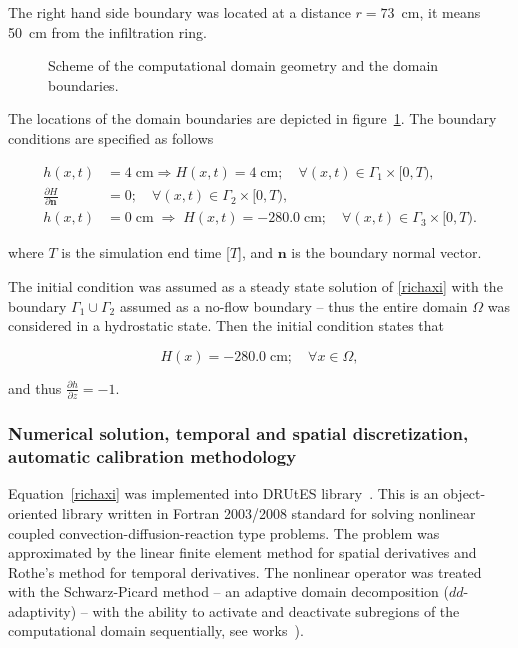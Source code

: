 \documentclass[review]{elsarticle}
\newenvironment{lineq}
    {\begin{linenomath*}
    \begin{equation}
    }
    { 
    \end{equation} 
    \end{linenomath*}
    }
\renewcommand{\vec}{\mathbf}
\begin{document}
The right hand side boundary was located at a distance $r=73$~cm, it means 50~cm from the infiltration ring. 

 \begin{figure}
\centering
{}
 \caption{Scheme of the computational domain geometry and the domain boundaries.}
 \label{valecbc}
\end{figure}


The locations of the domain boundaries are depicted in figure~\ref{valecbc}. The boundary conditions are specified as follows
\begin{lineq} 
\begin{split}
h(x,t) &= 4 \; \mbox{cm} \Rightarrow H(x,t) = 4 \; \mbox{cm}; \quad \forall (x,t) \in \Gamma_1 \times [0,T), \\
\frac{\partial H}{\partial \vec{n}} &= 0; \quad \forall (x,t) \in \Gamma_2 \times [0,T), \\
h(x,t) &= 0  \; \mbox{cm}  \; \Rightarrow \; H(x,t) = -280.0  \; \mbox{cm}; \quad \forall (x,t) \in \Gamma_3 \times [0,T).
\end{split}
\end{lineq}
where $T$ is the simulation end time [$T$], and $\vec{n}$ is the boundary normal vector.

The initial condition was assumed as a steady state  solution  of \eqref{richaxi} with the boundary $\Gamma_1 \cup \Gamma_2$ assumed as a no-flow boundary -- thus the entire domain $\Omega$ was considered in a hydrostatic state.  Then the initial condition states that 
\begin{lineq}
H(x) = -280.0 \; \mbox{cm}; \quad \forall x \in \Omega,
\end{lineq}
and thus $\frac{\partial h}{\partial z} = -1$.


\subsubsection{Numerical solution, temporal and spatial discretization, automatic calibration methodology}%
\label{trapoty}

Equation~\eqref{richaxi} was implemented into DRUtES library~\citep{drutes}. This is an object-oriented library written in Fortran 2003/2008 standard for solving nonlinear coupled convection-diffusion-reaction type problems. The problem was approximated by the linear finite element method for spatial derivatives and Rothe's method for temporal derivatives. The nonlinear operator was treated with the Schwarz-Picard method -- an adaptive domain decomposition  ($dd$-adaptivity) -- with the ability to activate and deactivate subregions of the computational domain sequentially, see works~\citep{mojecomp, mojejcam2, mojeamc2}).
\end{document}
